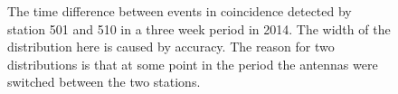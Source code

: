 \begin{figure}
    \centering
    
    \caption{ The
             time difference between events in coincidence detected by
             station 501 and 510 in a three week period in 2014. The
             width of the distribution here is caused by \gps accuracy.
             The reason for two distributions is that at some point in
             the period the \gps antennas were switched between the two
             stations.}
    \label{fig:station_offsets_501_510}
\end{figure}
